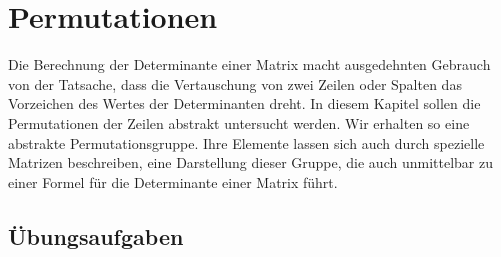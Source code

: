 %
%
%
\chapter{Permutationen
\label{buch:chapter:permutationen}}
\rhead{}
Die Berechnung der Determinante einer Matrix macht ausgedehnten
Gebrauch von der Tatsache, dass die Vertauschung von zwei Zeilen
oder Spalten das Vorzeichen des Wertes der Determinanten dreht.
In diesem Kapitel sollen die Permutationen der Zeilen abstrakt
untersucht werden.
Wir erhalten so eine abstrakte Permutationsgruppe.
Ihre Elemente lassen sich auch durch spezielle Matrizen beschreiben,
eine Darstellung dieser Gruppe, die auch unmittelbar zu einer
Formel für die Determinante einer Matrix führt.






\section*{Übungsaufgaben}
\begin{uebungsaufgaben}
\end{uebungsaufgaben}

